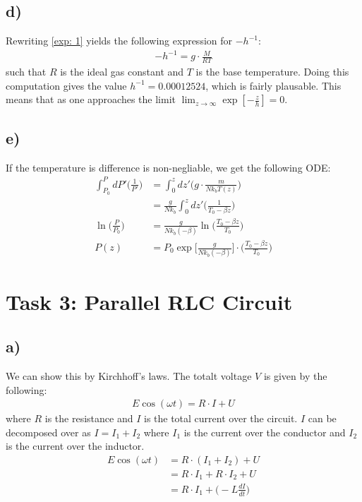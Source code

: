 \documentclass{article}
\begin{document}
\subsection*{d)}
Rewriting \eqref{exp: 1} yields the following expression for $-h^{-1}$:
\begin{align*}
    -h^{-1} = g\cdot\frac{M}{RT}
\end{align*}such that $R$ is the ideal gas constant and $T$ is the base temperature. Doing this computation gives the value $h^{-1} = 0.00012524$, which is fairly plausable. This means that as one approaches the limit $\lim_{z\to \infty}\exp[-\frac{z}{h}] = 0$.
\subsection*{e)}
If the temperature is difference is non-negliable, we get the following ODE:
\begin{align*}
    \int_{P_0}^P dP' \Big(\frac{1}{P'}\Big) &= \int_0^z dz'\Big(g\cdot\frac{m}{Nk_bT(z)}\Big)\\
    &=\frac{g}{Nk_b}\int_0^zdz'\Big(\frac{1}{T_0 - \beta z}\Big)\\
    \ln\Big(\frac{P}{P_0}\Big)&=\frac{g}{Nk_b(-\beta)}\ln\Big(\frac{T_0 - \beta z}{T_0}\Big)\\
    P(z)&=P_0\exp\Big[\frac{g}{Nk_b(-\beta)}\Big]\cdot\Big(\frac{T_0 - \beta z}{T_0}\Big)
\end{align*}


\section*{Task 3: Parallel RLC Circuit}
\subsection*{a)}
We can show this by Kirchhoff's laws.
The totalt voltage $V$ is given by the following:
\begin{align*}
    E\cos(\omega t) = R \cdot I + U 
\end{align*}where $R$ is the resistance and $I$ is the total current over the circuit. $I$ can be decomposed over as $I = I_1 + I_2$ where $I_1$ is the current over the conductor and $I_2$ is the current over the inductor.
\begin{align*}
    E\cos(\omega t) &= R\cdot(I_1 + I_2) + U\\
    &=R\cdot I_1 + R\cdot I_2 + U\\
    &= R\cdot I_1 + \Big(-L\frac{dI}{dt}\Big)
\end{align*}
\end{document}
